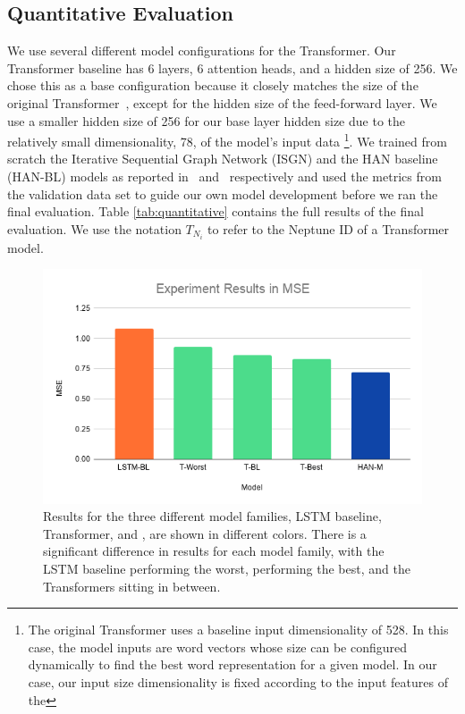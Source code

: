\subsection{Quantitative Evaluation}
We use several different model configurations for the Transformer. Our Transformer baseline has 6 layers, 6 attention heads, and a hidden size of 256. We chose this as a base configuration because it closely matches the size of the original Transformer~\cite{vaswani2017attention}, except for the hidden size of the feed-forward layer. We use a smaller hidden size of 256 for our base layer hidden size due to the relatively small dimensionality, 78, of the model's input data%
\footnote{The original Transformer uses a baseline input dimensionality of 528. In this case, the model inputs are word vectors whose size can be configured dynamically to find the best word representation for a given model. In our case, our input size dimensionality is fixed according to the input features of the \vnetf{}}. We trained from scratch the Iterative Sequential Graph Network (ISGN) and the HAN baseline (HAN-BL) models as reported in~\cite{jeong2019graph} and~\cite{jeong2019virtuosonet} respectively and used the metrics from the validation data set to guide our own model development before we ran the final evaluation. Table \ref{tab:quantitative} contains the full results of the final evaluation. We use the notation $T_{N_{i}}$ to refer to the Neptune ID of a Transformer model. 

\begin{figure}
    \centering
    \includegraphics[width=0.8\linewidth]{figs/ch5/experiment_results.png}
    \caption{Results for the three different model families, LSTM baseline, Transformer, and \vnet{}, are shown in different colors. There is a significant difference in results for each model family, with the LSTM baseline performing the worst, \vnet{} performing the best, and the Transformers sitting in between.}
    \label{fig:experiment_results}
\end{figure}

